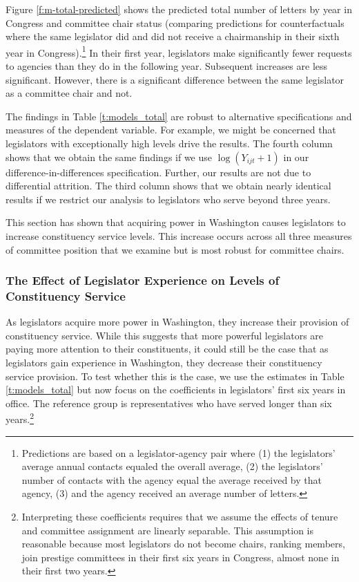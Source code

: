 \documentclass[12pt]{article}
\begin{document}
{Figure \ref{f:m-total-predicted} shows the predicted total number of letters by year in Congress and committee chair status (comparing predictions for counterfactuals where the same legislator did and did not receive a chairmanship in their sixth year in Congress).\footnote{Predictions are based on a legislator-agency pair where (1) the legislators' average annual contacts equaled the overall average, (2) the legislators' number of contacts with the agency equal the average received by that agency, (3) and the agency received an average number of letters.} In their first year, legislators make significantly fewer requests to agencies than they do in the following year. Subsequent increases are less significant. However, there is a significant difference between the same legislator as a committee chair and not.

The findings in Table \ref{t:models_total} are robust to alternative specifications and measures of the dependent variable. For example, we might be concerned that legislators with exceptionally high levels drive the results. The fourth column shows that we obtain the same findings if we use $\log (Y_{ijt} + 1)$ in our difference-in-differences specification. Further, our results are not due to differential attrition. The third column shows that we obtain nearly identical results if we restrict our analysis to legislators who serve beyond three years.    

This section has shown that acquiring power in Washington causes legislators to increase constituency service levels. This increase occurs across all three measures of committee position that we examine but is most robust for committee chairs. 


\subsubsection{The Effect of Legislator Experience on Levels of Constituency Service}\label{s:tenure} 

As legislators acquire more power in Washington, they increase their provision of constituency service. While this suggests that more powerful legislators are paying more attention to their constituents, it could still be the case that as legislators gain experience in Washington, they decrease their constituency service provision. To test whether this is the case, we use the estimates in Table \ref{t:models_total} but now focus on the coefficients in legislators' first six years in office. The reference group is representatives who have served longer than six years.\footnote{Interpreting these coefficients requires that we assume the effects of tenure and committee assignment are linearly separable. This assumption is reasonable because most legislators do not become chairs, ranking members, join prestige committees in their first six years in Congress, almost none in their first two years.} 

}
\end{document}
